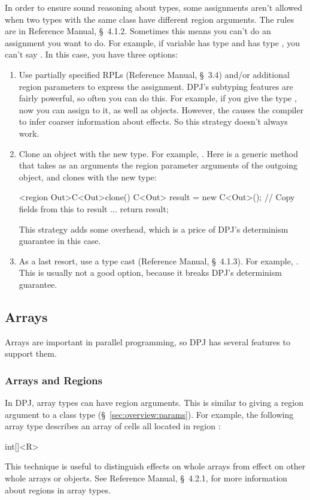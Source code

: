  In order to ensure sound reasoning
about types, some assignments aren't allowed when two types with the
same class have different region arguments.  The rules are in
Reference Manual, \S~4.1.2.  Sometimes this means you can't do an
assignment you want to do.  For example, if variable  has type
 and  has type , you can't say .
In this case, you have three options:
%
\begin{enumerate}
%
\item Use partially specified RPLs (Reference Manual, \S~3.4) and/or
  additional region parameters to express the assignment.  DPJ's
  subtyping features are fairly powerful, so often you can do this.
  For example, if you give  the type , now you can
  assign  to it, as well as  objects.  However, the
  \kwd{*} causes the compiler to infer coarser information about
  effects.  So this strategy doesn't always work.
%
\item Clone an object with the new type.  For example, . Here  is a generic method that takes as an
  arguments the region parameter arguments of the outgoing object, and
  clones  with the new type:
\begin{dpjlisting}
<region Out>C<Out>clone() {
    C<Out> result = new C<Out>();
    // Copy fields from this to result
    ...
    return result;
}
\end{dpjlisting}
%
This strategy adds some overhead, which is a price of DPJ's
determinism guarantee in this case.
%
\item As a last resort, use a type cast (Reference Manual,
  \S~4.1.3). For example, .  This is usually not a
  good option, because it breaks DPJ's determinism guarantee.
%
\end{enumerate}

\subsection{Arrays}

Arrays are important in parallel programming, so DPJ has several
features to support them.

\subsubsection{Arrays and Regions}

In DPJ, array types can have region arguments.  This is similar to
giving a region argument to a class type
(\S~\ref{sec:overview:params}).  For example, the following array type
describes an array of  cells all located in region :
%
\begin{dpjlisting}
int[]<R>
\end{dpjlisting}
%
This technique is useful to distinguish effects on whole arrays from
effect on other whole arrays or objects.  See Reference Manual,
\S~4.2.1, for more information about regions in array types.

